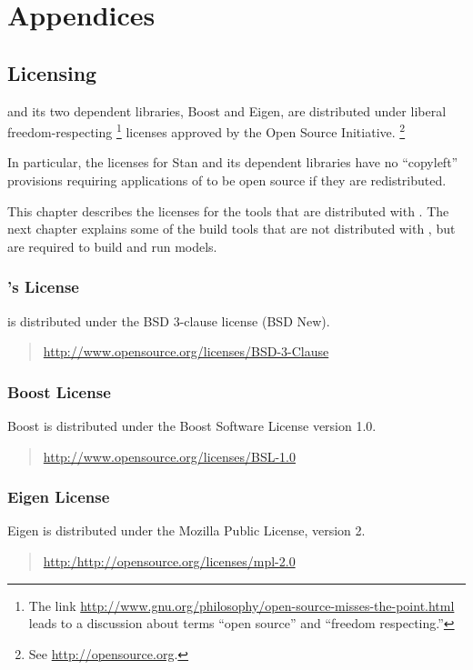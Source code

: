 
\part*{Appendices}


\chapter{Licensing}\label{licensing.appendix}

\noindent
\Stan and its two dependent libraries, Boost and Eigen, are
distributed under liberal freedom-respecting%
%
\footnote{The link
  \url{http://www.gnu.org/philosophy/open-source-misses-the-point.html}
  leads to a discussion about terms ``open
  source'' and ``freedom respecting.''}
%
licenses approved by the Open Source Initiative.%
\footnote{See \url{http://opensource.org}.}  

In particular, the licenses for Stan and its dependent libraries have
no ``copyleft'' provisions requiring applications of \Stan to be
open source if they are redistributed.

This chapter describes the licenses for the tools that are distributed
with \Stan.  The next chapter explains some of the build tools that
are not distributed with \Stan, but are required to build and run
\Stan models.

\section{\Stan's License}

\Stan is distributed under the BSD 3-clause license (BSD New).
%
\begin{quote}
\url{http://www.opensource.org/licenses/BSD-3-Clause}
\end{quote}

\section{Boost License}

Boost is distributed under the Boost Software
License version 1.0.
%
\begin{quote}
\url{http://www.opensource.org/licenses/BSL-1.0}
\end{quote}

\section{Eigen License} 
%
Eigen is distributed under the Mozilla Public License,
version 2.
%
\begin{quote}
\url{http:/http://opensource.org/licenses/mpl-2.0}
\end{quote}

